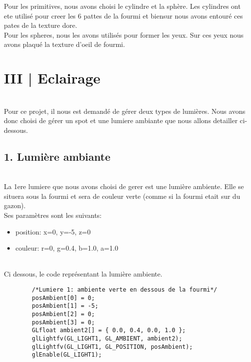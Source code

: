 \documentclass[11pt]{article}
\begin{document}
 Pour les primitives, nous avons choisi le cylindre et la sphère. Les cylindres ont ete utilisé pour creer les 6 pattes de la fourmi et biensur nous avons entouré ces pates de la texture dore.\\
 Pour les spheres, nous les avons utilisés pour former les yeux. Sur ces yeux nous avons plaqué la texture d'oeil de fourmi.



\newpage
\fancyhf{}

    \section*{\Large{III | Eclairage}}
    \\
    Pour ce projet, il nous est demandé de gérer deux types de lumières. Nous avons donc choisi de gérer un spot et une lumiere ambiante que nous allons detailler ci-dessous.
    
    \vspace{\baselineskip}
    
    \subsection*{1. Lumière ambiante}
    \\
    La 1ere lumiere que nous avons choisi de gerer est une lumière ambiente. Elle se situera sous la fourmi et sera de couleur verte (comme si la fourmi etait sur du gazon).
    \\
    Ses paramètres sont les suivants:
    \begin{itemize}
        \item position: x=0, y=-5, z=0
        \item couleur: r=0, g=0.4, b=1.0, a=1.0
    \end{itemize}
    \\
    Ci dessous, le code représentant la lumière ambiente.
    \begin{lstlisting}
        /*Lumiere 1: ambiente verte en dessous de la fourmi*/
        posAmbient[0] = 0;
        posAmbient[1] = -5;
        posAmbient[2] = 0;
        posAmbient[3] = 0;
        GLfloat ambient2[] = { 0.0, 0.4, 0.0, 1.0 };
        glLightfv(GL_LIGHT1, GL_AMBIENT, ambient2);
        glLightfv(GL_LIGHT1, GL_POSITION, posAmbient);
        glEnable(GL_LIGHT1);
    \end{lstlisting}
    
    \vspace{\baselineskip}
    
\end{document}
